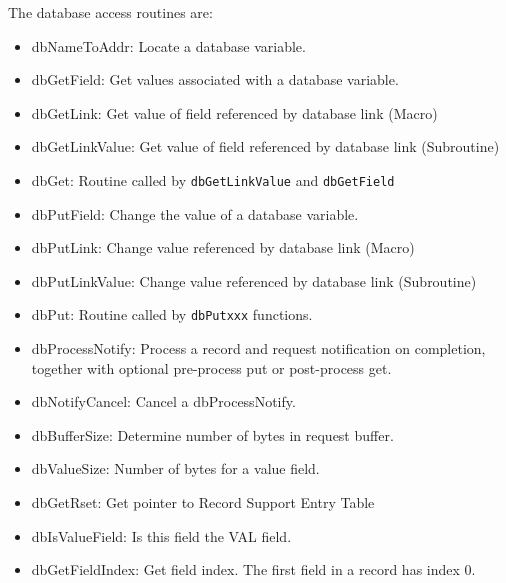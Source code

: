 The database access routines are:

\begin{itemize}

\item dbNameToAddr: Locate a database variable.

\item dbGetField: Get values associated with a database variable.

\item dbGetLink: Get value of field referenced by database link (Macro)

\item dbGetLinkValue: Get value of field referenced by database link (Subroutine)

\item dbGet: Routine called by \verb|dbGetLinkValue| and \verb|dbGetField|

\item dbPutField: Change the value of a database variable.

\item dbPutLink: Change value referenced by database link (Macro)

\item dbPutLinkValue: Change value referenced by database link (Subroutine)

\item dbPut: Routine called by \verb|dbPutxxx| functions.

\item dbProcessNotify: Process a record and request notification on completion, together with optional pre-process put or post-process get.

\item dbNotifyCancel: Cancel a dbProcessNotify.

\item dbBufferSize: Determine number of bytes in request buffer.

\item dbValueSize: Number of bytes for a value field.

\item dbGetRset: Get pointer to Record Support Entry Table

\item dbIsValueField: Is this field the VAL field.

\item dbGetFieldIndex: Get field index.
The first field in a record has index 0.


\end{itemize}

